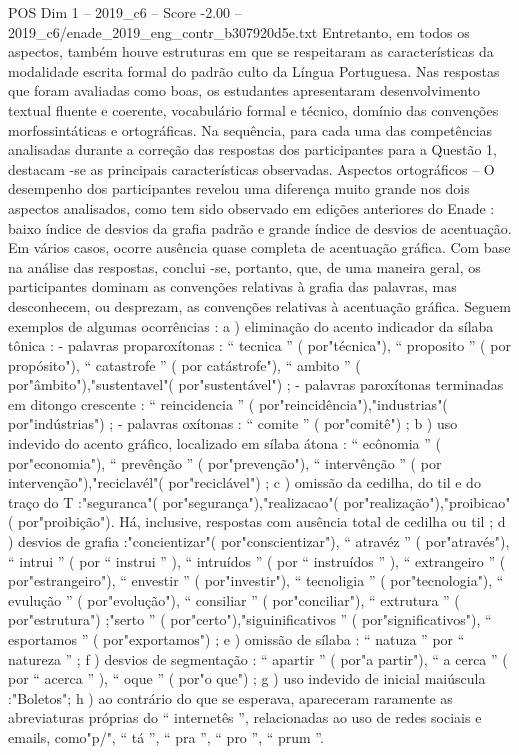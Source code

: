 \begin{textsample}{POS Dim 1 – 2019\_c6 – Score -2.00 – 2019\_c6/enade\_2019\_eng\_contr\_b307920d5e.txt}
Entretanto, em todos os aspectos, também houve estruturas em que se respeitaram as características da modalidade escrita formal do padrão culto da Língua Portuguesa.
Nas respostas que foram avaliadas como boas, os estudantes apresentaram desenvolvimento textual fluente e coerente, vocabulário formal e técnico, domínio das convenções morfossintáticas e ortográficas.
Na sequência, para cada uma das competências analisadas durante a correção das respostas dos participantes para a Questão 1, destacam -se as principais características observadas.
Aspectos ortográficos – O desempenho dos participantes revelou uma diferença muito grande nos dois aspectos analisados, como tem sido observado em edições anteriores do Enade : baixo índice de desvios da grafia padrão e grande índice de desvios de acentuação.
Em vários casos, ocorre ausência quase completa de acentuação gráfica.
Com base na análise das respostas, conclui -se, portanto, que, de uma maneira geral, os participantes dominam as convenções relativas à grafia das palavras, mas desconhecem, ou desprezam, as convenções relativas à acentuação gráfica.
Seguem exemplos de algumas ocorrências : a ) eliminação do acento indicador da sílaba tônica : - palavras proparoxítonas : “ tecnica ” ( por"técnica"), “ proposito ” ( por propósito"), “ catastrofe ” ( por catástrofe"), “ ambito ” ( por"âmbito"),"sustentavel"( por"sustentável") ; - palavras paroxítonas terminadas em ditongo crescente : “ reincidencia ” ( por"reincidência"),"industrias"( por"indústrias") ; - palavras oxítonas : “ comite ” ( por"comitê") ; b ) uso indevido do acento gráfico, localizado em sílaba átona : “ ecônomia ” ( por"economia"), “ prevênção ” ( por"prevenção"), “ intervênção ” ( por intervenção"),"reciclavél"( por"reciclável") ; c ) omissão da cedilha, do til e do traço do T :"seguranca"( por"segurança"),"realizacao"( por"realização"),"proibicao"( por"proibição").
Há, inclusive, respostas com ausência total de cedilha ou til ; d ) desvios de grafia :"concientizar"( por"conscientizar"), “ atravéz ” ( por"através"), “ intrui ” ( por “ instrui ” ), “ intruídos ” ( por “ instruídos ” ), “ extrangeiro ” ( por"estrangeiro"), “ envestir ” ( por"investir"), “ tecnoligia ” ( por"tecnologia"), “ evulução ” ( por"evolução"), “ consiliar ” ( por"conciliar"), “ extrutura ” ( por"estrutura") ;"serto ” ( por"certo"),"siguinificativos ” ( por"significativos"), “ esportamos ” ( por"exportamos") ; e ) omissão de sílaba : “ natuza ” por “ natureza ” ; f ) desvios de segmentação : “ apartir ” ( por"a partir"), “ a cerca ” ( por “ acerca ” ), “ oque ” ( por"o que") ; g ) uso indevido de inicial maiúscula :"Boletos"; h ) ao contrário do que se esperava, apareceram raramente as abreviaturas próprias do “ internetês ”, relacionadas ao uso de redes sociais e emails, como"p/", “ tá ”, “ pra ”, “ pro ”, “ prum ”.

\end{textsample}
